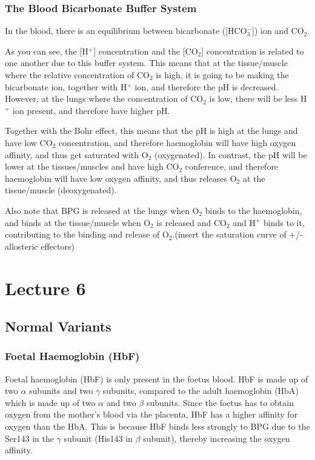 \documentclass[a4paper, 12pt]{report}
\newcommand{\mychapter}[2]{
    \setcounter{chapter}{#1}
    \setcounter{section}{0}
    \chapter*{#2}
    \addcontentsline{toc}{chapter}{#2}
}
\begin{document}
\subsection{The Blood Bicarbonate Buffer System}

In the blood, there is an equilibrium between bicarbonate ([HCO$_3^-$]) ion and CO$_2$.

\begin{center}
\end{center}

As you can see, the [H$^+$] concentration and the [CO$_2$] concentration is related to one another due to this buffer system.
This means that at the tissue/muscle where the relative concentration of CO$_2$ is high, it is going to be making the bicarbonate ion, together with H$^+$ ion, and therefore the pH is decreased.
However, at the lungs where the concentration of CO$_2$ is low, there will be less H$^+$ ion present, and therefore have higher pH.

Together with the Bohr effect, this means that the pH is high at the lungs and have low CO$_2$ concentration, and therefore haemoglobin will have high oxygen affinity, and thus get saturated with O$_2$ (oxygenated).
In contrast, the pH will be lower at the tissues/muscles and have high CO$_2$ conference, and therefore haemoglobin will have low oxygen affinity, and thus releases O$_2$ at the tissue/muscle (deoxygenated).

Also note that BPG is released at the lungs when O$_2$ binds to the haemoglobin, and binds at the tissue/muscle when O$_2$ is released and CO$_2$ and H$^+$ binds to it, contributing to the binding and release of O$_2$.(insert the saturation curve of +/- allosteric effectors)

\mychapter{6}{Lecture 6}

\section{Normal Variants}

\subsection{Foetal Haemoglobin (HbF)}

Foetal haemoglobin (HbF) is only present in the foetus blood.
HbF is made up of two $\alpha$ subunits and two $\gamma$ subunits, compared to the adult haemoglobin (HbA) which is made up of two $\alpha$ and two $\beta$ subunits.
Since the foetus has to obtain oxygen from the mother's blood via the placenta, HbF has a higher affinity for oxygen than the HbA.
This is because HbF binds less strongly to BPG due to the Ser143 in the $\gamma$ subunit (His143 in $\beta$ subunit), thereby increasing the oxygen affinity.
\end{document}
